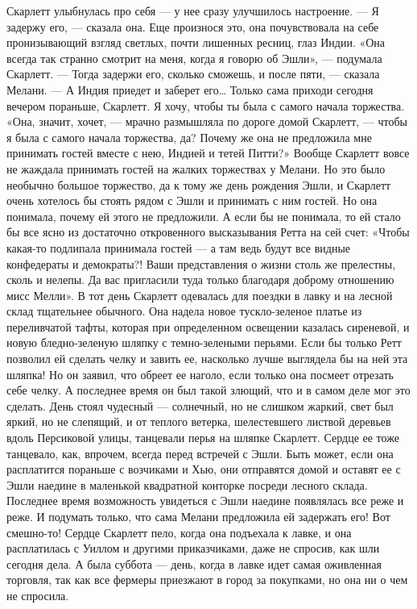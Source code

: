 Скарлетт улыбнулась про себя — у нее сразу улучшилось настроение.
— Я задержу его, — сказала она.
Еще произнося это, она почувствовала на себе пронизывающий взгляд светлых, почти лишенных ресниц, глаз Индии. «Она всегда так странно смотрит на меня, когда я говорю об Эшли», — подумала Скарлетт.
— Тогда задержи его, сколько сможешь, и после пяти, — сказала Мелани. — А Индия приедет и заберет его… Только сама приходи сегодня вечером пораньше, Скарлетт. Я хочу, чтобы ты была с самого начала торжества.
«Она, значит, хочет, — мрачно размышляла по дороге домой Скарлетт, — чтобы я была с самого начала торжества, да? Почему же она не предложила мне принимать гостей вместе с нею, Индией и тетей Питти?» Вообще Скарлетт вовсе не жаждала принимать гостей на жалких торжествах у Мелани. Но это было необычно большое торжество, да к тому же день рождения Эшли, и Скарлетт очень хотелось бы стоять рядом с Эшли и принимать с ним гостей. Но она понимала, почему ей этого не предложили. А если бы не понимала, то ей стало бы все ясно из достаточно откровенного высказывания Ретта на сей счет:
«Чтобы какая-то подлипала принимала гостей — а там ведь будут все видные конфедераты и демократы?! Ваши представления о жизни столь же прелестны, сколь и нелепы. Да вас пригласили туда только благодаря доброму отношению мисс Мелли».
В тот день Скарлетт одевалась для поездки в лавку и на лесной склад тщательнее обычного. Она надела новое тускло-зеленое платье из переливчатой тафты, которая при определенном освещении казалась сиреневой, и новую бледно-зеленую шляпку с темно-зелеными перьями. Если бы только Ретт позволил ей сделать челку и завить ее, насколько лучше выглядела бы на ней эта шляпка! Но он заявил, что обреет ее наголо, если только она посмеет отрезать себе челку. А последнее время он был такой злющий, что и в самом деле мог это сделать.
День стоял чудесный — солнечный, но не слишком жаркий, свет был яркий, но не слепящий, и от теплого ветерка, шелестевшего листвой деревьев вдоль Персиковой улицы, танцевали перья на шляпке Скарлетт. Сердце ее тоже танцевало, как, впрочем, всегда перед встречей с Эшли. Быть может, если она расплатится пораньше с возчиками и Хью, они отправятся домой и оставят ее с Эшли наедине в маленькой квадратной конторке посреди лесного склада. Последнее время возможность увидеться с Эшли наедине появлялась все реже и реже. И подумать только, что сама Мелани предложила ей задержать его! Вот смешно-то!
Сердце Скарлетт пело, когда она подъехала к лавке, и она расплатилась с Уиллом и другими приказчиками, даже не спросив, как шли сегодня дела. А была суббота — день, когда в лавке идет самая оживленная торговля, так как все фермеры приезжают в город за покупками, но она ни о чем не спросила.
